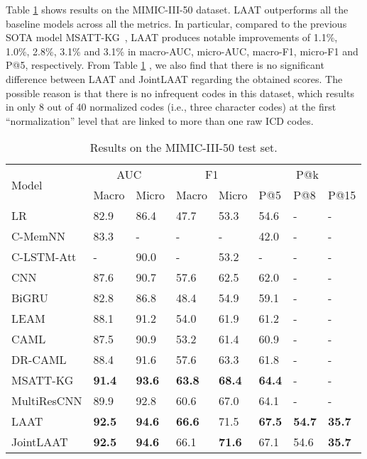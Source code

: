 \documentclass{article}
\begin{document}
Table \ref{tbl:mimiciii-50} shows results on the MIMIC-III-50 dataset. LAAT outperforms all the baseline models across all the metrics. In particular, compared to  the previous SOTA model MSATT-KG~\cite{xie2019ehr}, LAAT produces \mbox{notable} improvements of 1.1\%, 1.0\%, 2.8\%, 3.1\% and 3.1\% in macro-AUC, micro-AUC, macro-F1, micro-F1 and P@5, respectively. From Table \ref{tbl:mimiciii-50} , we also find that there is no significant difference between LAAT and JointLAAT regarding the obtained scores. The possible reason is that there is no infrequent codes in this dataset, which results in only 8 out of 40 normalized codes (i.e., three character codes) at the first ``normalization'' level that are linked to more than one raw ICD codes.   
\begingroup
\setlength{\tabcolsep}{2.5pt} \renewcommand{\arraystretch}{1.1} \begin{table}[!t]

\centering\small
\begin{tabular}{l|ll|ll|lll}
\hline
 \multirow{2}{*}{{Model}} &
 \multicolumn{2}{c|}{{AUC}} & \multicolumn{2}{c|}{{F1}} & \multicolumn{3}{c}{{P@k}} \\ \cline{2-8}

 &   Macro     & Micro &    Macro &     Micro & P@5 &  P@8 & P@15 \\ \hline
LR & 82.9 & 86.4 & 47.7 & 53.3 & 54.6 & - & - \\\hline
C-MemNN & 83.3 & - & - & - & 42.0 & - & - \\
C-LSTM-Att & - & 90.0 & - & 53.2 & - & - & - \\
CNN & 87.6 & 90.7 & 57.6 & 62.5 & 62.0 & - & - \\
BiGRU & 82.8 & 86.8 & 48.4 & 54.9 & 59.1 & - & - \\
LEAM & 88.1 & 91.2 & 54.0 & 61.9 & 61.2 & - & - \\
CAML & 87.5 & 90.9 & 53.2 & 61.4 & 60.9 & - & - \\
DR-CAML & 88.4 & 91.6 & 57.6 & 63.3 & 61.8 & - & - \\
MSATT-KG & \textbf{91.4} & \textbf{93.6} & \textbf{63.8} & \textbf{68.4} & \textbf{64.4} & - & - \\
MultiResCNN & 89.9 & 92.8 & 60.6 & 67.0 & 64.1 & - & - \\\hline\hline
LAAT  & \textbf{92.5} & \textbf{94.6} & \textbf{66.6} & 71.5 & \textbf{67.5} & \textbf{54.7} & \textbf{35.7} \\
JointLAAT  & \textbf{92.5} & \textbf{94.6} & 66.1 & \textbf{71.6} & 67.1 & 54.6 & \textbf{35.7} \\

\hline
\end{tabular}
\caption{Results on the  MIMIC-III-50 test set.}
\label{tbl:mimiciii-50}
\end{table}
\endgroup
\end{document}
